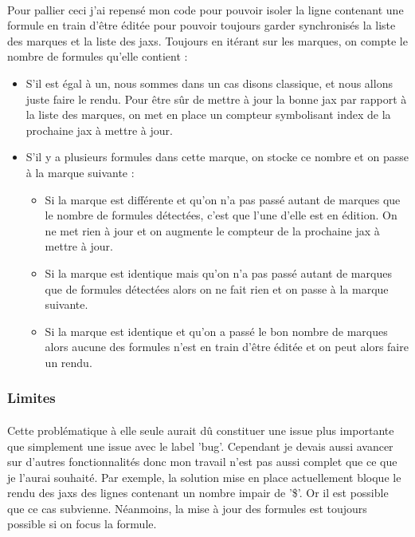 \documentclass[12pt]{article}
\begin{document}
\paragraph{}
Pour pallier ceci j'ai repensé mon code pour pouvoir isoler la ligne contenant une formule en train d'être éditée pour pouvoir toujours garder synchronisés la liste des marques et la liste des jaxs. Toujours en itérant sur les marques, on compte le nombre de formules qu'elle contient :\\
\begin{itemize}
    \item S'il est égal à un, nous sommes dans un cas disons classique, et nous allons juste faire le rendu. Pour être sûr de mettre à jour la bonne jax par rapport à la liste des marques, on met en place un compteur symbolisant index de la prochaine jax à mettre à jour.
    \item S'il y a plusieurs formules dans cette marque, on stocke ce nombre et on passe à la marque suivante :\\
    \begin{itemize}
        \item Si la marque est différente et qu'on n'a pas passé autant de marques que le nombre de formules détectées, c'est que l'une d'elle est en édition. On ne met rien à jour et on augmente le compteur de la prochaine jax à mettre à jour.
        \item Si la marque est identique mais qu'on n'a pas passé autant de marques que de formules détectées alors on ne fait rien et on passe à la marque suivante.
        \item Si la marque est identique et qu'on a passé le bon nombre de marques alors aucune des formules n'est en train d'être éditée et on peut alors faire un rendu.
    \end{itemize}
\end{itemize}

\subsubsection{Limites}
\paragraph{}
Cette problématique à elle seule aurait dû constituer une issue plus importante que simplement une issue avec le label 'bug'. Cependant je devais aussi avancer sur d'autres fonctionnalités donc mon travail n'est pas aussi complet que ce que je l'aurai souhaité. Par exemple, la solution mise en place actuellement bloque le rendu des jaxs des lignes contenant un nombre impair de '\$'. Or il est possible que ce cas subvienne. Néanmoins, la mise à jour des formules est toujours possible si on focus la formule.
\end{document}
